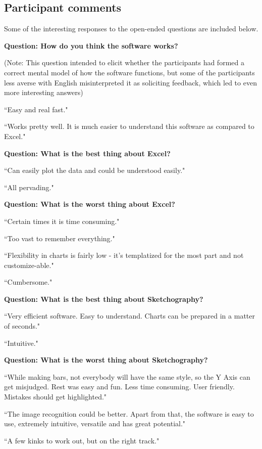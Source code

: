 \subsection{Participant comments}
Some of the interesting responses to the open-ended questions are included below.

\textbf{Question: How do you think the software works?}

(Note: This question intended to elicit whether the participants had formed a correct mental model of how the software functions, but some of the participants less averse with English misinterpreted it as soliciting feedback, which led to even more interesting answers)

``Easy and real fast."

``Works pretty well. It is much easier to understand this software as compared to Excel."



\textbf{Question: What is the best thing about Excel?}

``Can easily plot the data and could be understood easily."

``All pervading."

\textbf{Question: What is the worst thing about Excel?}

``Certain times it is time consuming."

``Too vast to remember everything."

``Flexibility in charts is fairly low - it's templatized for the most part and not customize-able."

``Cumbersome."


\textbf{Question: What is the best thing about Sketchography?}

``Very efficient software. Easy to understand. Charts can be prepared in a matter of seconds."

``Intuitive."

\textbf{Question: What is the worst thing about Sketchography?}

``While making bars, not everybody will have the same style, so the Y Axis can get misjudged. Rest was easy and fun. Less time consuming. User friendly. Mistakes should get highlighted."

``The image recognition could be better. Apart from that, the software is easy to use, extremely intuitive, versatile and has great potential."

``A few kinks to work out, but on the right track."

